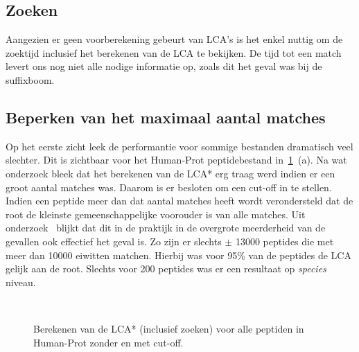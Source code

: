 \subsection{Zoeken}
Aangezien er geen voorberekening gebeurt van LCA's is het enkel nuttig om de zoektijd inclusief het berekenen van de LCA te bekijken.
De tijd tot een match levert ons nog niet alle nodige informatie op, zoals dit het geval was bij de suffixboom.

\subsection{Beperken van het maximaal aantal matches}\label{subsec:maximaal-aantal-matches}
Op het eerste zicht leek de performantie voor sommige bestanden dramatisch veel slechter.
Dit is zichtbaar voor het Human-Prot peptidebestand in~\ref{fig:cutoff_humanprot}~(a).
Na wat onderzoek bleek dat het berekenen van de LCA* erg traag werd indien er een groot aantal matches was.
Daarom is er besloten om een cut-off in te stellen.
Indien een peptide meer dan dat aantal matches heeft wordt verondersteld dat de root de kleinste gemeenschappelijke voorouder is van alle matches.
Uit onderzoek~\cite{unipept_cutoff} blijkt dat dit in de praktijk in de overgrote meerderheid van de gevallen ook effectief het geval is.
Zo zijn er slechts $\pm$ 13000 peptides die met meer dan 10000 eiwitten matchen.
Hierbij was voor 95\% van de peptides de LCA gelijk aan de root.
Slechts voor 200 peptides was er een resultaat op \textit{species} niveau.
\\
\begin{figure}[H]
    \centering
    \\[4ex] %

    \caption{Berekenen van de LCA* (inclusief zoeken) voor alle peptiden in Human-Prot zonder en met cut-off.}\label{fig:cutoff_humanprot}
\end{figure}

